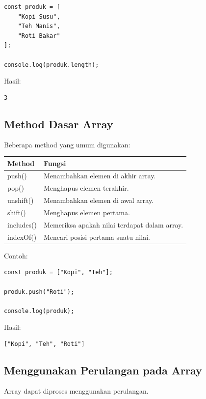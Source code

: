 \documentclass[12pt,a4paper]{article}
\begin{document}
\begin{lstlisting}
const produk = [
    "Kopi Susu",
    "Teh Manis",
    "Roti Bakar"
];

console.log(produk.length);
\end{lstlisting}

Hasil:

\begin{lstlisting}
3
\end{lstlisting}

\subsection{Method Dasar Array}

Beberapa method yang umum digunakan:

\begin{center}
\begin{tabularx}{\textwidth}{lX}
\toprule
\textbf{Method} & \textbf{Fungsi} \\
\midrule
push() & Menambahkan elemen di akhir array. \\
pop() & Menghapus elemen terakhir. \\
unshift() & Menambahkan elemen di awal array. \\
shift() & Menghapus elemen pertama. \\
includes() & Memeriksa apakah nilai terdapat dalam array. \\
indexOf() & Mencari posisi pertama suatu nilai. \\
\bottomrule
\end{tabularx}
\end{center}

Contoh:

\begin{lstlisting}
const produk = ["Kopi", "Teh"];

produk.push("Roti");

console.log(produk);
\end{lstlisting}

Hasil:

\begin{lstlisting}
["Kopi", "Teh", "Roti"]
\end{lstlisting}

\subsection{Menggunakan Perulangan pada Array}

Array dapat diproses menggunakan perulangan.
\end{document}
